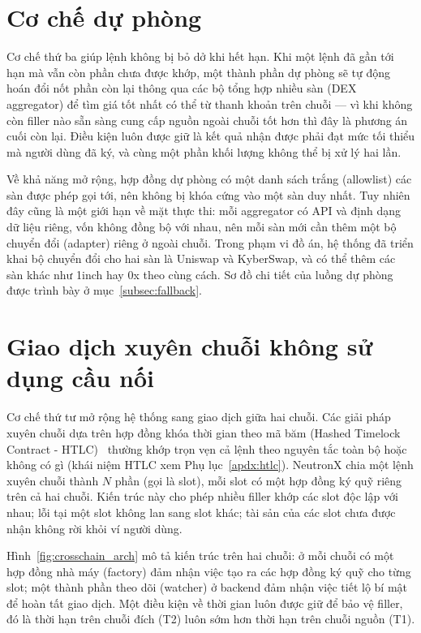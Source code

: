 \documentclass[../DoAn.tex]{subfiles}
\begin{document}
\section{Cơ chế dự phòng}
\label{section:2.5}

Cơ chế thứ ba giúp lệnh không bị bỏ dở khi hết hạn. Khi một lệnh đã gần tới hạn mà vẫn còn phần chưa được khớp, một thành phần dự phòng sẽ tự động hoán đổi nốt phần còn lại thông qua các bộ tổng hợp nhiều sàn (DEX aggregator) để tìm giá tốt nhất có thể từ thanh khoản trên chuỗi --- vì khi không còn filler nào sẵn sàng cung cấp nguồn ngoài chuỗi tốt hơn thì đây là phương án cuối còn lại. Điều kiện luôn được giữ là kết quả nhận được phải đạt mức tối thiểu mà người dùng đã ký, và cùng một phần khối lượng không thể bị xử lý hai lần.

Về khả năng mở rộng, hợp đồng dự phòng có một danh sách trắng (allowlist) các sàn được phép gọi tới, nên không bị khóa cứng vào một sàn duy nhất. Tuy nhiên đây cũng là một giới hạn về mặt thực thi: mỗi aggregator có API và định dạng dữ liệu riêng, vốn không đồng bộ với nhau, nên mỗi sàn mới cần thêm một bộ chuyển đổi (adapter) riêng ở ngoài chuỗi. Trong phạm vi đồ án, hệ thống đã triển khai bộ chuyển đổi cho hai sàn là Uniswap và KyberSwap, và có thể thêm các sàn khác như 1inch hay 0x theo cùng cách. Sơ đồ chi tiết của luồng dự phòng được trình bày ở mục~\ref{subsec:fallback}.

\section{Giao dịch xuyên chuỗi không sử dụng cầu nối}
\label{section:2.6}

Cơ chế thứ tư mở rộng hệ thống sang giao dịch giữa hai chuỗi. Các giải pháp xuyên chuỗi dựa trên hợp đồng khóa thời gian theo mã băm (Hashed Timelock Contract - HTLC)~\cite{herlihy2018atomic} thường khớp trọn vẹn cả lệnh theo nguyên tắc toàn bộ hoặc không có gì (khái niệm HTLC xem Phụ lục~\ref{apdx:htlc}). NeutronX chia một lệnh xuyên chuỗi thành $N$ phần (gọi là slot), mỗi slot có một hợp đồng ký quỹ riêng trên cả hai chuỗi. Kiến trúc này cho phép nhiều filler khớp các slot độc lập với nhau; lỗi tại một slot không lan sang slot khác; tài sản của các slot chưa được nhận không rời khỏi ví người dùng.

Hình~\ref{fig:crosschain_arch} mô tả kiến trúc trên hai chuỗi: ở mỗi chuỗi có một hợp đồng nhà máy (factory) đảm nhận việc tạo ra các hợp đồng ký quỹ cho từng slot; một thành phần theo dõi (watcher) ở backend đảm nhận việc tiết lộ bí mật để hoàn tất giao dịch. Một điều kiện về thời gian luôn được giữ để bảo vệ filler, đó là thời hạn trên chuỗi đích (T2) luôn sớm hơn thời hạn trên chuỗi nguồn (T1).
\end{document}
